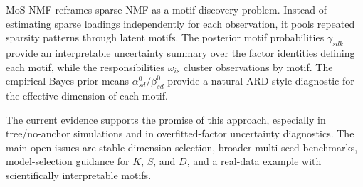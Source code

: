 \documentclass[11pt]{article}
\theoremstyle{definition}
\begin{document}
MoS-NMF reframes sparse NMF as a motif discovery problem. Instead of estimating
sparse loadings independently for each observation, it pools repeated sparsity
patterns through latent motifs. The posterior motif probabilities
$\bar{\gamma}_{sdk}$ provide an interpretable uncertainty summary over the
factor identities defining each motif, while the responsibilities $\omega_{is}$
cluster observations by motif. The empirical-Bayes prior means
$\alpha_{sd}^0/\beta_{sd}^0$ provide a natural ARD-style diagnostic for the
effective dimension of each motif.

The current evidence supports the promise of this approach, especially in
tree/no-anchor simulations and in overfitted-factor uncertainty diagnostics.
The main open issues are stable dimension selection, broader multi-seed
benchmarks, model-selection guidance for $K$, $S$, and $D$, and a real-data
example with scientifically interpretable motifs.



\end{document}
